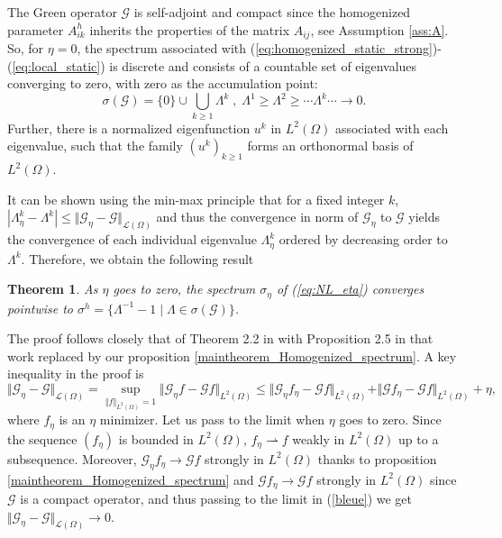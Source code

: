 \documentclass[a4paper,reqno]{amsart}
\numberwithin{equation}{section}
\numberwithin{equation}{section}		%
\numberwithin{figure}{section}			%
\numberwithin{table}{section}				%
\newtheorem{theorem}{Theorem}[section]
\theoremstyle{definition}
\newcommand{\<}{\ensuremath \leq}
\renewcommand{\>}{\ensuremath \geq}
\def\e{\eta}
\begin{document}
The Green operator ${\mathcal G}$ is self-adjoint and compact since the homogenized parameter $A^h_{ik}$ inherits the properties of the matrix $A_{ij}$, see Assumption \ref{ass:A}. So, for $\eta=0$, the spectrum associated with (\ref{eq:homogenized_static_strong})-(\ref{eq:local_static}) is discrete and consists of a countable set of eigenvalues converging to zero, with zero as the accumulation point:
\begin{equation}
    \sigma({\mathcal G})=\{0\}\cup\bigcup_{k\geq 1}\Lambda^k \; , \; \Lambda^1\geq \Lambda^2\geq
    \cdots
    \Lambda^k \cdots \to 0.
\end{equation}
Further, there is a normalized eigenfunction $u^k$ in $L^2(\Omega)$ associated with each eigenvalue, such that the family ${(u^k)}_{k\geq 1}$ forms an orthonormal basis of $L^2(\Omega)$.

It can be shown using the min-max principle that
for a fixed integer $k$, $| \Lambda_\eta^k-\Lambda^k | \leq \Vert {\mathcal G}_\eta - {\mathcal G} \Vert_{{\mathcal L}(\Omega)}$ and thus the convergence in norm of ${\mathcal G}_\eta$ to ${\mathcal G}$ yields the convergence of each individual eigenvalue $\Lambda_\eta^k$ ordered by decreasing order to $\Lambda^k$. Therefore, we obtain the following result

\begin{theorem}\label{thm: SpectralhomogenizedLimit}
As $\e$ goes to zero, the spectrum $\sigma_\e$ of (\ref{eq:NL_eta}) converges pointwise to $\sigma^h=\{\Lambda^{-1}-1 \mid \Lambda\in \sigma({\mathcal G})\}$.
\end{theorem}

The proof follows closely that of Theorem 2.2 in \cite{allaire1998bloch} with Proposition 2.5 in that work replaced by our proposition \ref{maintheorem_Homogenized_spectrum}.
A key inequality in the proof is
\begin{equation}\label{bleue}
   \Vert {\mathcal G}_\eta - {\mathcal G} \Vert_{{\mathcal L}(\Omega)} =  \sup_{{\Vert f \Vert}_{L^2(\Omega)}=1} \Vert{\mathcal G}_\e f-{\mathcal G}f\Vert_{L^2(\Omega)} \leq\Vert{\mathcal G}_\e f_\e-{\mathcal G}f\Vert_{L^2(\Omega)} + \Vert{\mathcal G} f_\e-{\mathcal G}f\Vert_{L^2(\Omega)} + \e,
\end{equation}
where $f_\e$ is an $\e$ minimizer.
Let us pass to the limit when $\e$ goes to zero.
Since the sequence $(f_\e)$ is bounded in $L^2(\Omega)$, $f_\e\rightharpoonup f$ weakly in $L^2(\Omega)$ up to a subsequence. Moreover, ${\mathcal G}_\e f_\e\to{\mathcal G} f$ strongly in $L^2(\Omega)$ thanks to proposition \ref{maintheorem_Homogenized_spectrum} and ${\mathcal G}f_\e\to{\mathcal G} f$ strongly in $L^2(\Omega)$ since ${\mathcal G}$ is a compact operator, and thus passing to the limit in (\ref{bleue}) we get $\Vert {\mathcal G}_\eta - {\mathcal G} \Vert_{{\mathcal L}(\Omega)}\to 0$.
\end{document}
